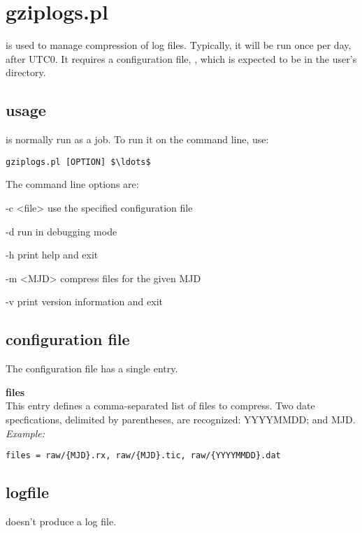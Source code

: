 \section{gziplogs.pl \label{s:gziplogs}}

 is used to manage compression of log files. 
Typically, it will be run once per day, after UTC0. It requires 
a configuration file, , which is expected to be
in the user's  directory. 

\subsection{usage}

 is normally run as a  job. To run it on the command line, use:
\begin{lstlisting}[mathescape=true]
gziplogs.pl [OPTION] $\ldots$
\end{lstlisting}
The command line options are:
\begin{description*}
	\item[-c \textless file\textgreater] use the specified configuration file
	\item[-d]	run in debugging mode
	\item[-h]	print help and exit
	\item[-m \textless MJD\textgreater] compress files for the given MJD
	\item[-v]	print version information and exit
\end{description*}

\subsection{configuration file}

The configuration file has a single entry.

{\bfseries files}\\
This entry defines a comma-separated list of files to compress. Two date specfications, 
delimited by parentheses, are recognized: YYYYMMDD; and MJD.\\
\textit{Example:}
\begin{lstlisting}
files = raw/{MJD}.rx, raw/{MJD}.tic, raw/{YYYYMMDD}.dat
\end{lstlisting}

\subsection{logfile}

 doesn't produce a log file.